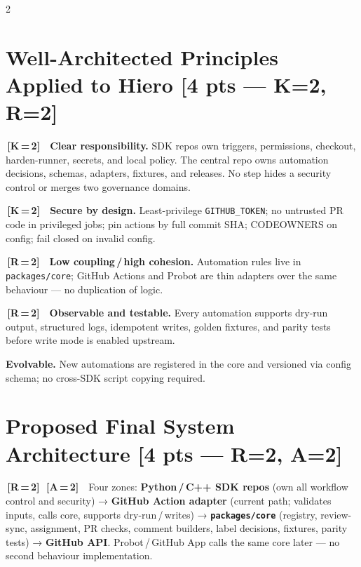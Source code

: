 \documentclass[9pt, a4paper]{article}
\newcommand{\ic}[2]{%
  {\colorbox{tag#1}{\color{white}\bfseries\fontsize{5.5}{6.5}\selectfont\,[#1\,=\,#2]\,}}%
}
\DeclareRobustCommand{\mb}[1]{%
  \texorpdfstring{\hfill{\fontsize{6.5}{7}\selectfont\color{hieroGray}[#1]}}{}%
}
\DeclareRobustCommand{\slink}[1]{%
  \texorpdfstring{\hspace{4pt}{\fontsize{7}{8}\selectfont\color{hieroAccent}\textbf{#1}}}{}%
}
\begin{document}
\begin{multicols}{2}
\fontsize{8.5}{10.5}\selectfont

\section{Well-Architected Principles Applied to Hiero \mb{4 pts — K=2, R=2}}

\ic{K}{2}\ \textbf{Clear responsibility.}
SDK repos own triggers, permissions, checkout, harden-runner, secrets, and local policy.
The central repo owns automation decisions, schemas, adapters, fixtures, and releases.
No step hides a security control or merges two governance domains.

\ic{K}{2}\ \textbf{Secure by design.}
Least-privilege \texttt{GITHUB\_TOKEN}; no untrusted PR code in privileged jobs;
pin actions by full commit SHA; CODEOWNERS on config; fail closed on invalid config.

\ic{R}{2}\ \textbf{Low coupling\,/\,high cohesion.}
Automation rules live in \texttt{packages/core}; GitHub Actions and Probot are thin adapters
over the same behaviour — no duplication of logic.

\ic{R}{2}\ \textbf{Observable and testable.}
Every automation supports dry-run output, structured logs, idempotent writes, golden
fixtures, and parity tests before write mode is enabled upstream.

\textbf{Evolvable.}
New automations are registered in the core and versioned via config schema; no
cross-SDK script copying required.

\section{Proposed Final System Architecture \mb{4 pts — R=2, A=2} \slink{↗ Link}}

\ic{R}{2}\ic{A}{2}\ Four zones: \textbf{Python\,/\,C++ SDK repos} (own all workflow control and
security) → \textbf{GitHub Action adapter} (current path; validates inputs, calls core,
supports dry-run\,/\,writes) → \textbf{\texttt{packages/core}} (registry, review-sync, assignment,
PR checks, comment builders, label decisions, fixtures, parity tests) → \textbf{GitHub API}.
Probot\,/\,GitHub App calls the same core later — no second behaviour implementation.


\end{multicols}
\end{document}
